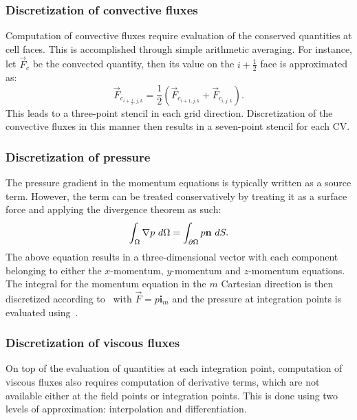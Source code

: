 \subsubsection{Discretization of convective fluxes}
%
Computation of convective fluxes require evaluation of the conserved quantities at cell faces. This is accomplished through simple arithmetic averaging. For instance, let $\vec{F}_c$ be the convected quantity, then its value on the $i+\frac{1}{2}$ face is approximated as:
\begin{equation}
    \vec{F}_{c_{i+\frac{1}{2},j,k}} = \frac{1}{2}\left(
        \vec{F}_{c_{i+1,j,k}} + \vec{F}_{c_{i,j,k}}
    \right)
    \label{eq:synavg}.
\end{equation}
This leads to a three-point stencil in each grid direction. Discretization of the convective fluxes in this manner then results in a seven-point stencil for each CV.
%
\subsubsection{Discretization of pressure}
%
The pressure gradient in the momentum equations is typically written as a source term. However, the term can be treated conservatively by treating it as a surface force and applying the divergence theorem as such:
\begin{equation*}
    \int_\Omega \nabla p~d\Omega = \int_{\partial \Omega} p\mathbf{n}~dS.
\end{equation*}
The above equation results in a three-dimensional vector with each component belonging to either the $x$-momentum, $y$-momentum and $z$-momentum equations. The integral for the momentum equation in the $m$ Cartesian direction is then discretized according to~ with $\vec{F} = p \boldsymbol{i}_m$ and the pressure at integration points is evaluated using~.
%
\subsubsection{Discretization of viscous fluxes}
%
On top of the evaluation of quantities at each integration point, computation of viscous fluxes also requires computation of derivative terms, which are not available either at the field points or integration points. This is done using two levels of approximation: interpolation and differentiation. 

